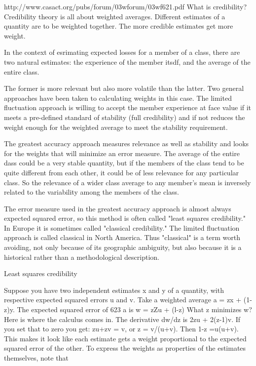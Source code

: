 http://www.casact.org/pubs/forum/03wforum/03wf621.pdf
What is credibility?
Credibility theory is all about weighted averages. Different estimates of a quantity are to be
weighted together. The more credible estimates get more weight.

In the context of esrimating expected losses for a member of a class, there are two natural estimates:
the experience of the member itsdf, and the average of the entire class. 

The former is more relevant but also more volatile than the latter. Two general approaches have been taken to
calculating weights in this case. The limited fluctuation approach is willing to accept the member
experience at face value if it meets a pre-defined standard of stability (full credibility) and if not
reduces the weight enough for the weighted average to meet the stability requirement. 

The greatest accuracy approach measures relevance as well as stability and looks for the weights that
will minimize an error measure. The average of the entire dass could be a very stable quantity,
but if the members of the class tend to be quite different from each other, it could be of less
relevance for any particular class. So the relevance of a wider class average to any member's
mean is inversely related to the variability among the members of the class.

The error measure used in the greatest accuracy approach is almost always expected squared error,
so this method is often called "least squares credibility." In Europe it is sometimes called
"classical credibility." The limited fluctuation approach is called classical in North America. Thus
"classical" is a term worth avoiding, not only because of its geographic ambiguity, but also because
it is a historical rather than a methodological description.

Least squares credibility

Suppose you have two independent estimates x and y of a quantity, with respective expected
squared errors u and v. Take a weighted average a = zx + (1-z)y. The expected squared error of
623
a is w = zZu + (l-z)%
What z minimizes w? Here is where the calculus comes in. The derivative dw/dz is 2zu + 2(z-1)v. 
If you set that to zero you get: zu+zv = v, or z = v/(u+v). Then
1-z =u(u+v). 
This makes it look like each estimate gets a weight proportional to the expected
squared error of the other. To express the weights as properties of the estimates themselves, note that

